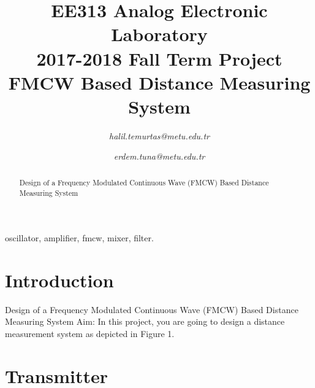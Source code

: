 \documentclass[paper]{IEEEtran}
\begin{document}
\title{EE313 Analog Electronic Laboratory\\
2017-2018 Fall Term Project \\
FMCW Based Distance Measuring System
}


\author{

\textit{halil.temurtas@metu.edu.tr}

\and

\textit{erdem.tuna@metu.edu.tr}

}

\maketitle

\begin{abstract}

Design of a Frequency Modulated Continuous Wave (FMCW) Based Distance Measuring System

\end{abstract}

\begin{IEEEkeywords}
oscillator, amplifier, fmcw, mixer, filter.
\end{IEEEkeywords}

\section{Introduction}

Design of a Frequency Modulated Continuous Wave (FMCW) Based Distance Measuring System
Aim: In this project, you are going to design a distance measurement system as depicted in Figure 1.

\section{Transmitter}
\end{document}
